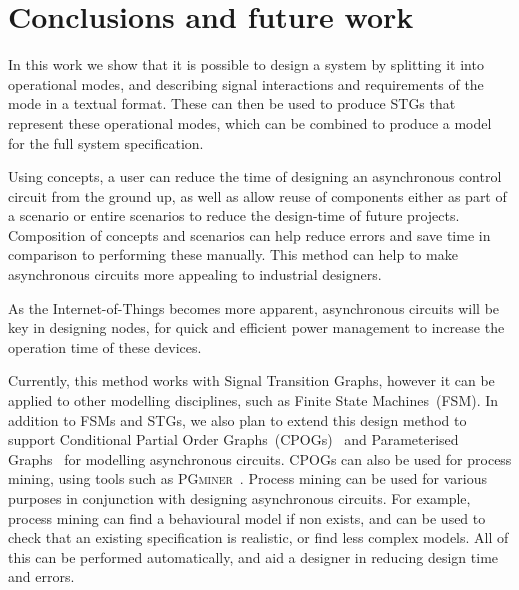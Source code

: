 \documentclass[british,compsoc]{IEEEtran}
\newcommand{\noun}[1]{\textsc{#1}}
\begin{document}
\section{Conclusions and future work\label{sec:conclusions}}

In this work we show that it is possible to design a system by splitting
it into operational modes, and describing signal interactions and requirements
of the mode in a textual format. These can then be used to produce STGs
that represent these operational modes, which can be combined to
produce a model for the full system specification.

Using concepts, a user can reduce the time of designing an asynchronous
control circuit from the ground up, as well as allow reuse of components
either as part of a scenario or entire scenarios to reduce the design-time
of future projects. Composition of concepts and scenarios can help
reduce errors and save time in comparison to performing these manually.
This method can help to make asynchronous circuits more appealing
to industrial designers.

As the Internet-of-Things becomes more apparent, asynchronous circuits
will be key in designing nodes, for quick and efficient power management
to increase the operation time of these devices.

Currently, this method works with Signal Transition Graphs, however
it can be applied to other modelling disciplines, such as Finite State
Machines~(FSM). In addition to FSMs and STGs, we also plan to extend
this design method to support Conditional Partial Order
Graphs~(CPOGs)~\cite{CPOG1} and Parameterised
Graphs~\cite{mokhov2014algebra} for modelling asynchronous circuits.
CPOGs can also be used for process mining, using tools such as
\noun{PGminer}~\cite{mokhov_2016_mining}\cite{pgminer}. Process mining
can be used for various purposes in conjunction with designing
asynchronous circuits. For example, process mining can find a
behavioural model if non exists, and can be
used to check that an existing specification is realistic, or find less
complex models. All of this can be performed automatically, and aid a
designer in reducing design time and errors.

\end{document}
